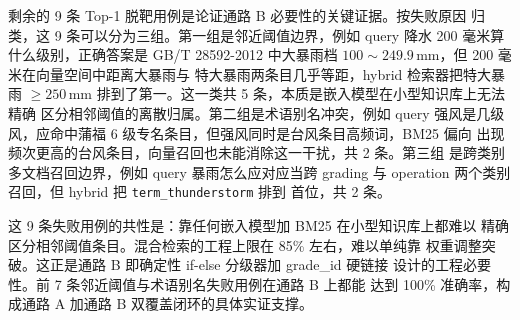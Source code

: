 剩余的 9 条 Top-1 脱靶用例是论证通路 B 必要性的关键证据。按失败原因
归类，这 9 条可以分为三组。第一组是邻近阈值边界，例如 query 降水
200 毫米算什么级别，正确答案是 GB/T 28592-2012 中大暴雨档
$100\sim249.9\,\mathrm{mm}$，但 200 毫米在向量空间中距离大暴雨与
特大暴雨两条目几乎等距，hybrid 检索器把特大暴雨 $\geq 250\,\mathrm{mm}$
排到了第一。这一类共 5 条，本质是嵌入模型在小型知识库上无法精确
区分相邻阈值的离散归属。第二组是术语别名冲突，例如 query 强风是几级
风，应命中蒲福 6 级专名条目，但强风同时是台风条目高频词，BM25 偏向
出现频次更高的台风条目，向量召回也未能消除这一干扰，共 2 条。第三组
是跨类别多文档召回边界，例如 query 暴雨怎么应对应当跨 grading 与
operation 两个类别召回，但 hybrid 把 \texttt{term\_\bk{}thunderstorm} 排到
首位，共 2 条。

这 9 条失败用例的共性是：靠任何嵌入模型加 BM25 在小型知识库上都难以
精确区分相邻阈值条目。混合检索的工程上限在 85\% 左右，难以单纯靠
权重调整突破。这正是通路 B 即确定性 if-else 分级器加 grade\_id 硬链接
设计的工程必要性。前 7 条邻近阈值与术语别名失败用例在通路 B 上都能
达到 100\% 准确率，构成通路 A 加通路 B 双覆盖闭环的具体实证支撑。

